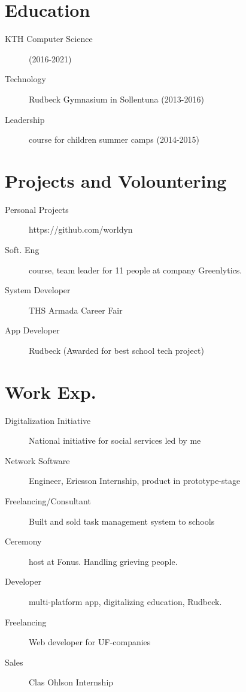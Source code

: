 \documentclass[margin,line,a4paper]{resume}
\begin{document}
\begin{resume}
\section{\mysidestyle Education}\vspace{1mm}
    \begin{description}
        \item[KTH Computer Science] (2016-2021)
        \item[Technology] Rudbeck Gymnasium in Sollentuna (2013-2016)
        \item[Leadership] course for children summer camps (2014-2015)
    \end{description} 

\section{\mysidestyle Projects and Volountering}\vspace{1mm}
\begin{description}
    \item[Personal Projects] https://github.com/worldyn
    \item[Soft. Eng] course, team leader for 11 people at company Greenlytics.   
     \item[System Developer] THS Armada Career Fair
    \item[App Developer] Rudbeck (Awarded for best school tech project) 

\end{description}  
  
\section{\mysidestyle Work Exp.}\vspace{1mm}
\begin{description}
    \item[Digitalization Initiative] National initiative for social services led by me
    \item[Network Software] Engineer, Ericsson Internship, product in prototype-stage
    \item[Freelancing/Consultant] Built and sold task management system to schools
    \item[Ceremony] host at Fonus. Handling grieving people.
    \item[Developer] multi-platform app, digitalizing education, Rudbeck.
    \item[Freelancing] Web developer for UF-companies
    \item[Sales] Clas Ohlson Internship
\end{description}


\end{resume}
\end{document}

